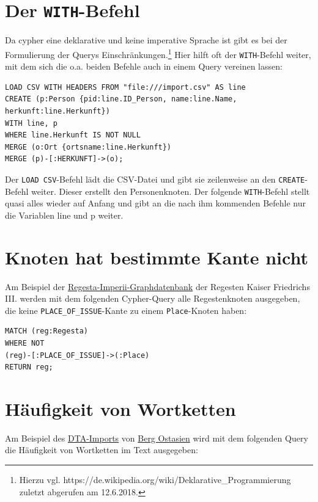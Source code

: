 \documentclass[ngerman,]{scrreprt}
\begin{document}
\section{\texorpdfstring{Der \texttt{WITH}-Befehl}{Der WITH-Befehl}}\label{der-with-befehl}

Da cypher eine deklarative und keine imperative Sprache ist gibt es bei der Formulierung der Querys Einschränkungen.\footnote{Hierzu vgl. https://de.wikipedia.org/wiki/Deklarative\_Programmierung zuletzt abgerufen am 12.6.2018.} Hier hilft oft der \texttt{WITH}-Befehl weiter, mit dem sich die o.a. beiden Befehle auch in einem Query vereinen lassen:

\begin{verbatim}
LOAD CSV WITH HEADERS FROM "file:///import.csv" AS line
CREATE (p:Person {pid:line.ID_Person, name:line.Name, herkunft:line.Herkunft})
WITH line, p
WHERE line.Herkunft IS NOT NULL
MERGE (o:Ort {ortsname:line.Herkunft})
MERGE (p)-[:HERKUNFT]->(o);
\end{verbatim}

Der \texttt{LOAD\ CSV}-Befehl lädt die CSV-Datei und gibt sie zeilenweise an den \texttt{CREATE}-Befehl weiter. Dieser erstellt den Personenknoten. Der folgende \texttt{WITH}-Befehl stellt quasi alles wieder auf Anfang und gibt an die nach ihm kommenden Befehle nur die Variablen line und p weiter.

\section{Knoten hat bestimmte Kante nicht}\label{knoten-hat-bestimmte-kante-nicht}

Am Beispiel der \href{http://134.176.70.65:10210/browser/}{Regesta-Imperii-Graphdatenbank} der Regesten Kaiser Friedrichs III. werden mit dem folgenden Cypher-Query alle Regestenknoten ausgegeben, die keine \texttt{PLACE\_OF\_ISSUE}-Kante zu einem \texttt{Place}-Knoten haben:

\begin{verbatim}
MATCH (reg:Regesta)
WHERE NOT
(reg)-[:PLACE_OF_ISSUE]->(:Place)
RETURN reg;
\end{verbatim}

\section{Häufigkeit von Wortketten}\label{huxe4ufigkeit-von-wortketten}

Am Beispiel des \href{http://134.176.70.65:10220/browser/}{DTA-Imports} von \href{http://www.deutschestextarchiv.de/book/show/berg_ostasien01_1864}{Berg Ostasien} wird mit dem folgenden Query die Häufigkeit von Wortketten im Text ausgegeben:
\end{document}
